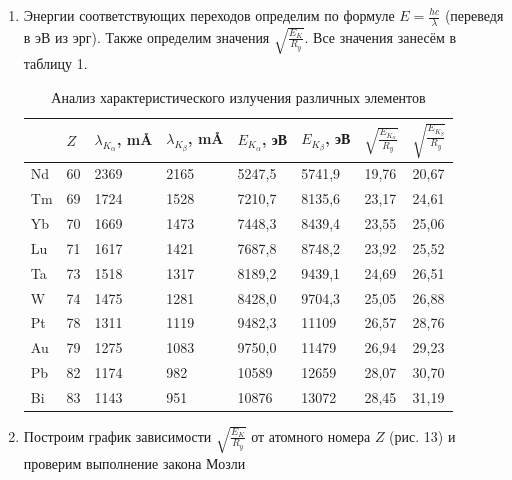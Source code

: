 \documentclass[a4paper]{article}
\begin{document}
\begin{enumerate}
\clearpage

\item Энергии соответствующих переходов определим по формуле $E = \frac{h c}{\lambda}$ (переведя в эВ из эрг). Также определим значения $\sqrt{\frac{E_{K}}{R_y}}$. Все значения занесём в таблицу 1.


    \begin{table}[h]
    \centering
    \begin{center}
    \caption{Анализ характеристического излучения различных элементов}
    \end{center}
    \vspace{0.1cm}
    \label{tab:my_label}
    \begin{tabular}{|p{1cm}|p{1cm}|p{2cm}|p{2cm}|p{2cm}|p{2cm}|p{2cm}|p{2cm}|}
\hline
 & $Z$ & $\lambda_{K_{\alpha}}$, m\AA & $\lambda_{K_{\beta}}$, m\AA & $E_{K_{\alpha}}$, эВ & $E_{K_{\beta}}$, эВ & $\sqrt{\frac{E_{K_{\alpha}}}{R_y}}$ & $\sqrt{\frac{E_{K_{\beta}}}{R_y}}$  \\
 \hline
Nd & 60 & 2369 & 2165 & 5247,5 & 5741,9 & 19,76 & 20,67
\\
 \hline
Tm & 69 & 1724 & 1528 & 7210,7 & 8135,6 & 23,17 & 24,61
\\
\hline
Yb & 70 & 1669 & 1473 & 7448,3 & 8439,4 & 23,55 & 25,06
\\
\hline
Lu & 71 & 1617 & 1421 & 7687,8 & 8748,2 & 23,92 & 25,52
\\
\hline
Ta & 73 & 1518 & 1317 & 8189,2 & 9439,1 & 24,69 & 26,51
\\
\hline
W & 74 & 1475 & 1281 & 8428,0 & 9704,3 & 25,05 & 26,88
\\
\hline
Pt & 78 & 1311 & 1119 & 9482,3 & 11109 & 26,57 & 28,76
\\
\hline
Au & 79 & 1275 & 1083 & 9750,0 & 11479 & 26,94 & 29,23
\\
\hline
Pb & 82 & 1174 & 982 & 10589 & 12659 & 28,07 & 30,70
\\
\hline
Bi & 83 & 1143 & 951 & 10876 & 13072 & 28,45 & 31,19
\\
\hline
\end{tabular}
\end{table} 

\item Построим график зависимости $\sqrt{\frac{E_{K}}{R_y}}$ от атомного номера $Z$ (рис. 13) и проверим выполнение закона Мозли


\end{enumerate}
\end{document}
